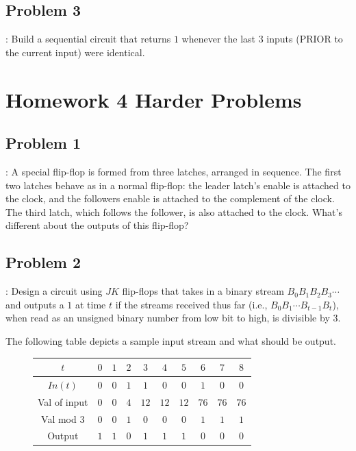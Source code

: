 \documentclass{../slides}
\begin{document}
\subsection{Problem 3}
\begin{frame}{\secname: \subsecname}
    Build a sequential circuit that returns $1$ whenever the last $3$ inputs (PRIOR to the current input) were identical.
\end{frame}

\section{Homework 4 Harder Problems}
\subsection{Problem 1}
\begin{frame}{\secname: \subsecname}
    A special flip-flop is formed from three latches, arranged in sequence. The first two latches behave as in a normal flip-flop: the leader latch’s enable is attached to the clock, and the followers enable is attached to the complement of the clock. The third latch, which follows the follower, is also attached to the clock. What's different about the outputs of this flip-flop?
\end{frame}

\subsection{Problem 2}
\begin{frame}{\secname: \subsecname}
    Design a circuit using $JK$ flip-flops that takes in a binary stream $B_0B_1B_2B_3\cdots$ and outputs a $1$ at time $t$ if the streams received thus far (i.e., $B_0B_1\cdots B_{t-1}B_t$), when read as an unsigned binary number from low bit to high, is divisible by $3$.

    The following table depicts a sample input stream and what should be output.
    \begin{figure}[H]
        \centering
        \begin{tabular}{|c||c|c|c|c|c|c|c|c|c|}\hline 
            $t$ & $0$ & $1$ & $2$ & $3$ & $4$ & $5$ & $6$ & $7$ & $8$ \\\hline
            $In(t)$ & $0$ & $0$ & $1$ & $1$ & $0$ & $0$ & $1$ & $0$ & $0$ \\\hline
            Val of input & $0$ & $0$ & $4$ & $12$ & $12$ & $12$ & $76$ & $76$ & $76$ \\\hline
            Val mod $3$ & $0$ & $0$ & $1$ & $0$ & $0$ & $0$ & $1$ & $1$ & $1$ \\\hline
            Output & $1$ & $1$ & $0$ & $1$ & $1$ & $1$ & $0$ & $0$ & $0$ \\\hline
        \end{tabular}
    \end{figure}
\end{frame}
\end{document}
